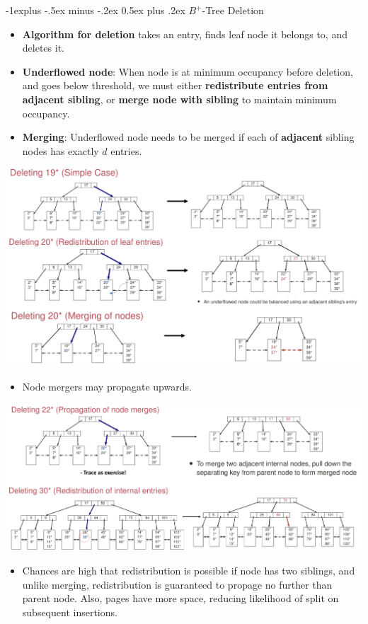 \documentclass[10pt, landscape]{article}
\makeatletter
\renewcommand{\subsection}{\@startsection{subsection}{2}{0mm}%
                                {-1explus -.5ex minus -.2ex}%
                                {0.5ex plus .2ex}%
                                {\normalfont\normalsize\bfseries}}
\makeatother
\begin{document}
\begin{multicols*}{3}
\subsection{$B^+$-Tree Deletion}
\begin{itemize}
\item \textbf{Algorithm for deletion} takes an entry, finds leaf node it belongs to, and deletes it.
\item \textbf	{Underflowed node}: When node is at minimum occupancy before deletion, and goes below threshold, we must either \textbf{redistribute entries from adjacent sibling}, or \textbf{merge node with sibling} to maintain minimum occupancy.
\item \textbf{Merging}: Underflowed node needs to be merged if each of \textbf{adjacent} sibling nodes has exactly $d$ entries.
\end{itemize}
\centerline{\includegraphics[width = 1\linewidth]{Bdeletion1}}
\begin{itemize}
\item  Node mergers may propagate upwards.
\end{itemize}
\centerline{\includegraphics[width = 1\linewidth]{Bdeletion2}}
\begin{itemize}
\item Chances are high that redistribution is possible if node has two siblings, and unlike merging, redistribution is guaranteed to propage no further than parent node. Also, pages have more space, reducing likelihood of split on subsequent insertions.
\end{itemize}


\end{multicols*}
\end{document}
